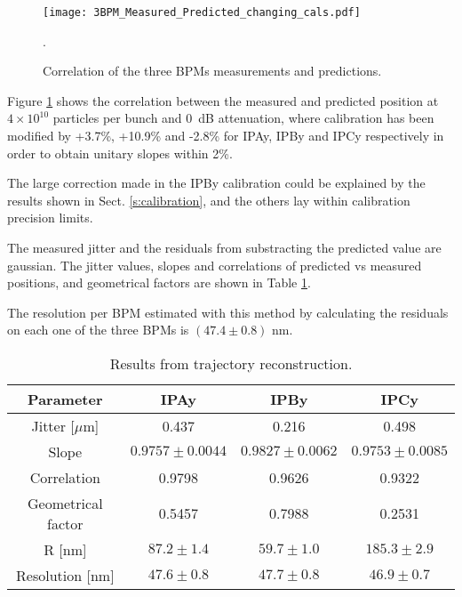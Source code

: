 \begin{figure}[!htb]
\centering%
 \texttt{[image: 3BPM\_Measured\_Predicted\_changing\_cals.pdf]}\caption{Correlation of the three BPMs measurements and predictions.}\label{f:3BPMpredictions}.
\end{figure}
Figure \ref{f:3BPMpredictions} shows the correlation between the measured and predicted position at $4\times10^{10}$ particles per bunch and 0~dB attenuation, where calibration has been modified by +3.7\%, +10.9\% and -2.8\% for IPAy, IPBy and IPCy respectively in order to obtain unitary slopes within 2\%.\par
The large correction made in the IPBy calibration could be explained by the results shown in Sect. \ref{s:calibration}, and the others lay within calibration precision limits.\par
The measured jitter and the residuals from substracting the predicted value are gaussian. The jitter values, slopes and correlations of predicted vs measured positions, and geometrical factors are shown in Table \ref{t:resodata}.\par
The resolution per BPM estimated with this method by calculating the residuals on each one of the three BPMs is $(47.4\pm0.8)$ nm.\par
\begin{table}[hbt]
\centering
\begin{tabular}{c||c|c|c}\hline
Parameter & IPAy & IPBy & IPCy\\ \hline\hline
Jitter [$\mu$m] & 0.437 & 0.216 & 0.498\\\hline
Slope & $0.9757\pm0.0044$ & $0.9827\pm0.0062$ & $0.9753\pm0.0085$\\\hline
Correlation & 0.9798 & 0.9626 & 0.9322 \\\hline
Geometrical factor & 0.5457 & 0.7988 & 0.2531\\\hline
R [nm] & $87.2\pm1.4$&$59.7\pm1.0$ & $185.3\pm2.9$\\\hline
Resolution [nm] & $47.6\pm0.8$ & $47.7\pm0.8$ & $46.9\pm0.7$ \\\hline
\end{tabular}\caption{Results from trajectory reconstruction.}\label{t:resodata}
\end{table}
